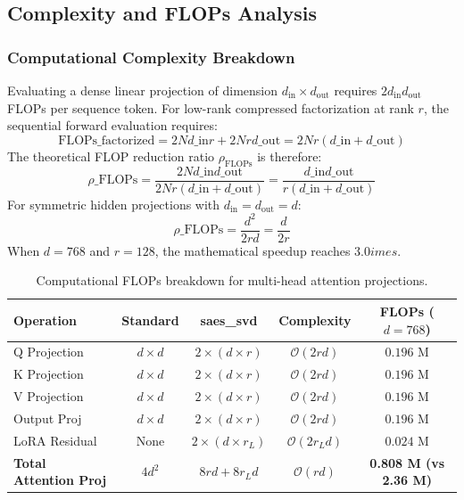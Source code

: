 \subsection{Complexity and FLOPs Analysis}
\subsubsection{Computational Complexity Breakdown}
Evaluating a dense linear projection of dimension $d_{\text{in}} \times d_{\text{out}}$ requires $2 d_{\text{in}} d_{\text{out}}$ FLOPs per sequence token. For low-rank compressed factorization at rank $r$, the sequential forward evaluation requires:
\[
\text{FLOPs}\_{\text{factorized}} = 2 N d\_{\text{in}} r + 2 N r d\_{\text{out}} = 2 N r (d\_{\text{in}} + d\_{\text{out}})
\]
The theoretical FLOP reduction ratio $\rho_{\text{FLOPs}}$ is therefore:
\[
\rho\_{\text{FLOPs}} = \frac{2 N d\_{\text{in}} d\_{\text{out}}}{2 N r (d\_{\text{in}} + d\_{\text{out}})} = \frac{d\_{\text{in}} d\_{\text{out}}}{r (d\_{\text{in}} + d\_{\text{out}})}
\]
For symmetric hidden projections with $d_{\text{in}} = d_{\text{out}} = d$:
\[
\rho\_{\text{FLOPs}} = \frac{d^2}{2 r d} = \frac{d}{2 r}
\]
When $d = 768$ and $r = 128$, the mathematical speedup reaches $3.0	imes$.

\begin{table}[H]
\centering
\small
\begin{tabular}{lcccc}
\toprule
\textbf{Operation} & \textbf{Standard} & \textbf{saes\_svd} & \textbf{Complexity} & \textbf{FLOPs ($d=768$)} \\
\midrule
Q Projection & $d \times d$ & $2 \times (d \times r)$ & $\mathcal{O}(2rd)$ & $0.196$ M \\
K Projection & $d \times d$ & $2 \times (d \times r)$ & $\mathcal{O}(2rd)$ & $0.196$ M \\
V Projection & $d \times d$ & $2 \times (d \times r)$ & $\mathcal{O}(2rd)$ & $0.196$ M \\
Output Proj & $d \times d$ & $2 \times (d \times r)$ & $\mathcal{O}(2rd)$ & $0.196$ M \\
LoRA Residual & None & $2 \times (d \times r_L)$ & $\mathcal{O}(2r_L d)$ & $0.024$ M \\
\midrule
\textbf{Total Attention Proj} & $4 d^2$ & $8rd + 8r_L d$ & $\mathcal{O}(rd)$ & \textbf{0.808 M (vs 2.36 M)} \\
\bottomrule
\end{tabular}
\caption{Computational FLOPs breakdown for multi-head attention projections.}
\end{table}

